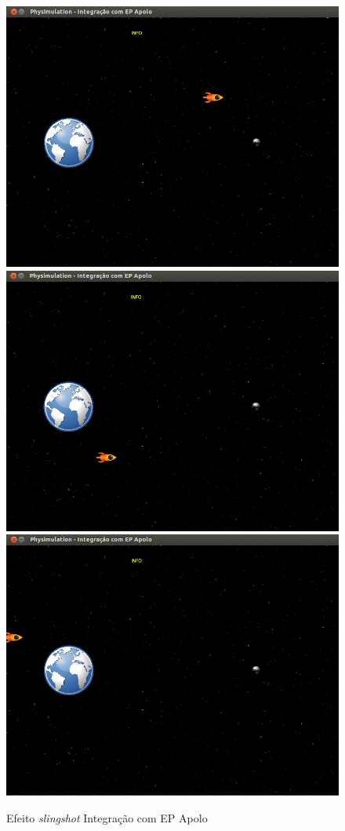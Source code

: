 \begin{figure}[H]
	\includegraphics[scale=0.22]{images/apolo-2.png}
	\includegraphics[scale=0.22]{images/apolo-1.png}
	\includegraphics[scale=0.22]{images/apolo-5.png}
	\caption{Efeito \textit{slingshot} Integração com EP Apolo}
\end{figure}


